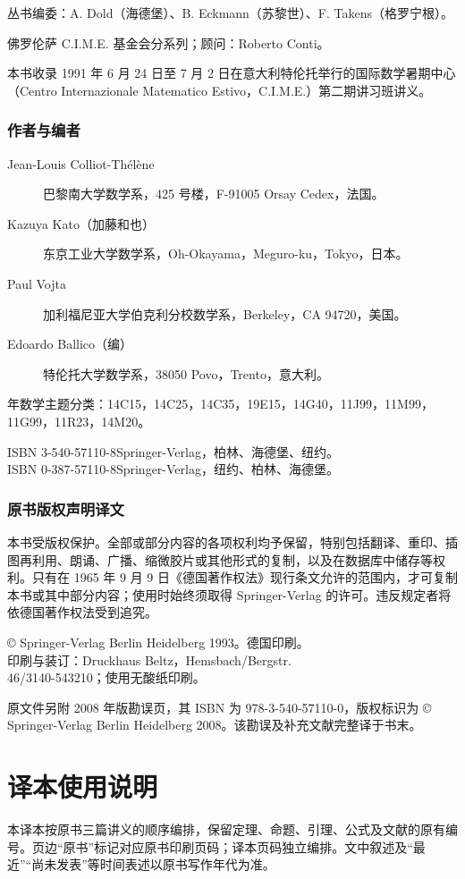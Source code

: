 丛书编委：A. Dold（海德堡）、B. Eckmann（苏黎世）、F. Takens（格罗宁根）。

佛罗伦萨 C.I.M.E. 基金会分系列；顾问：Roberto Conti。

本书收录 1991 年 6 月 24 日至 7 月 2 日在意大利特伦托举行的国际数学暑期中心（Centro Internazionale Matematico Estivo，C.I.M.E.）第二期讲习班讲义。

\subsection*{作者与编者}
\begin{description}
\item[Jean-Louis Colliot-Thélène]巴黎南大学数学系，425 号楼，F-91005 Orsay Cedex，法国。
\item[Kazuya Kato（加藤和也）]东京工业大学数学系，Oh-Okayama，Meguro-ku，Tokyo，日本。
\item[Paul Vojta]加利福尼亚大学伯克利分校数学系，Berkeley，CA 94720，美国。
\item[Edoardo Ballico（编）]特伦托大学数学系，38050 Povo，Trento，意大利。
\end{description}

 年数学主题分类：14C15，14C25，14C35，19E15，14G40，11J99，11M99，11G99，11R23，14M20。

\noindent ISBN 3-540-57110-8\quad Springer-Verlag，柏林、海德堡、纽约。\\
ISBN 0-387-57110-8\quad Springer-Verlag，纽约、柏林、海德堡。

\subsection*{原书版权声明译文}
本书受版权保护。全部或部分内容的各项权利均予保留，特别包括翻译、重印、插图再利用、朗诵、广播、缩微胶片或其他形式的复制，以及在数据库中储存等权利。只有在 1965 年 9 月 9 日《德国著作权法》现行条文允许的范围内，才可复制本书或其中部分内容；使用时始终须取得 Springer-Verlag 的许可。违反规定者将依德国著作权法受到追究。

\noindent © Springer-Verlag Berlin Heidelberg 1993。德国印刷。\\
印刷与装订：Druckhaus Beltz，Hemsbach/Bergstr.\\
46/3140-543210；使用无酸纸印刷。

原文件另附 2008 年版勘误页，其 ISBN 为 978-3-540-57110-0，版权标识为 © Springer-Verlag Berlin Heidelberg 2008。该勘误及补充文献完整译于书末。

\chapter*{译本使用说明}
本译本按原书三篇讲义的顺序编排，保留定理、命题、引理、公式及文献的原有编号。页边“原书”标记对应原书印刷页码；译本页码独立编排。文中叙述及“最近”“尚未发表”等时间表述以原书写作年代为准。

